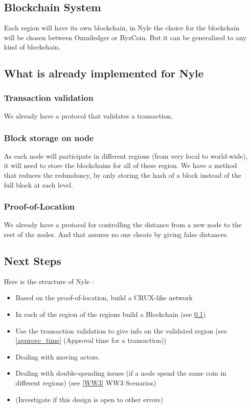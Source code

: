 \documentclass[a4paper,11pt,oneside]{report}
\begin{document}
\subsection{Blockchain System} \label{blockchain_subsection}

Each region will have its own blockchain, in Nyle the choice for the blockchain
will be chosen between Omniledger or ByzCoin. But it can be generalized to any
kind of blockchain.

\subsection{What is already implemented for Nyle} 
\subsubsection{Transaction validation} 
We already have a protocol that validates a transaction.

\subsubsection{Block storage on node} As each node will participate in different
regions (from very local to world-wide), it will need to store the blockchains
for all of these region. We have a method that reduces the redundancy, by only
storing the hash of a block instead of the full block at each level. 

\subsubsection{Proof-of-Location} We already have a protocol for controlling the
distance from a new node to the rest of the nodes. And that assures no one
cheats by giving false distances. 


\subsection{Next Steps}
Here is the structure of Nyle :

\begin{itemize}
 \item Based on the proof-of-location, build a CRUX-like network 
 \item In each of the region of the regions build a Blockchain (see \ref{blockchain_subsection})
 \item Use the transaction validation to give info on the validated region (see \ref{approve_time} (Approval time for a transaction))
 \item Dealing with moving actors.
 \item Dealing with double-spending issues (if a node spend the same coin in different regions) (see \ref{WW3} WW3 Scenarios)
 \item (Investigate if this design is open to other errors)
\end{itemize}
\end{document}
